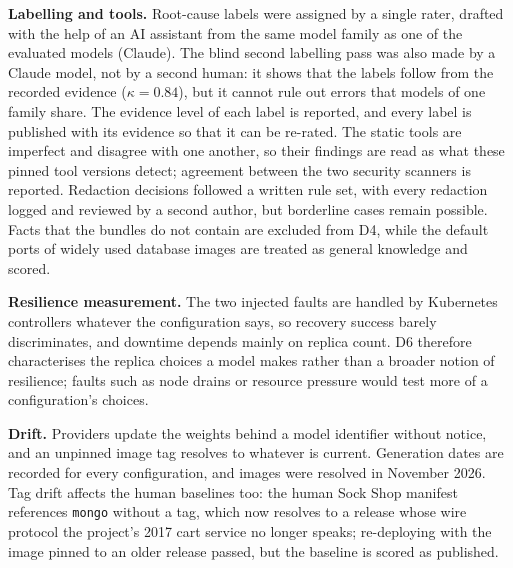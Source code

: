 \textbf{Labelling and tools.} Root-cause labels were assigned by a single rater, drafted with the help of an AI assistant from the same model family as one of the evaluated models (Claude). The blind second labelling pass was also made by a Claude model, not by a second human: it shows that the labels follow from the recorded evidence ($\kappa=0.84$), but it cannot rule out errors that models of one family share. The evidence level of each label is reported, and every label is published with its evidence so that it can be re-rated. The static tools are imperfect and disagree with one another, so their findings are read as what these pinned tool versions detect; agreement between the two security scanners is reported. Redaction decisions followed a written rule set, with every redaction logged and reviewed by a second author, but borderline cases remain possible. Facts that the bundles do not contain are excluded from D4, while the default ports of widely used database images are treated as general knowledge and scored.

\textbf{Resilience measurement.} The two injected faults are handled by Kubernetes controllers whatever the configuration says, so recovery success barely discriminates, and downtime depends mainly on replica count. D6 therefore characterises the replica choices a model makes rather than a broader notion of resilience; faults such as node drains or resource pressure would test more of a configuration's choices.

\textbf{Drift.} Providers update the weights behind a model identifier without notice, and an unpinned image tag resolves to whatever is current. Generation dates are recorded for every configuration, and images were resolved in November 2026. Tag drift affects the human baselines too: the human Sock Shop manifest references \texttt{mongo} without a tag, which now resolves to a release whose wire protocol the project's 2017 cart service no longer speaks; re-deploying with the image pinned to an older release passed, but the baseline is scored as published.
